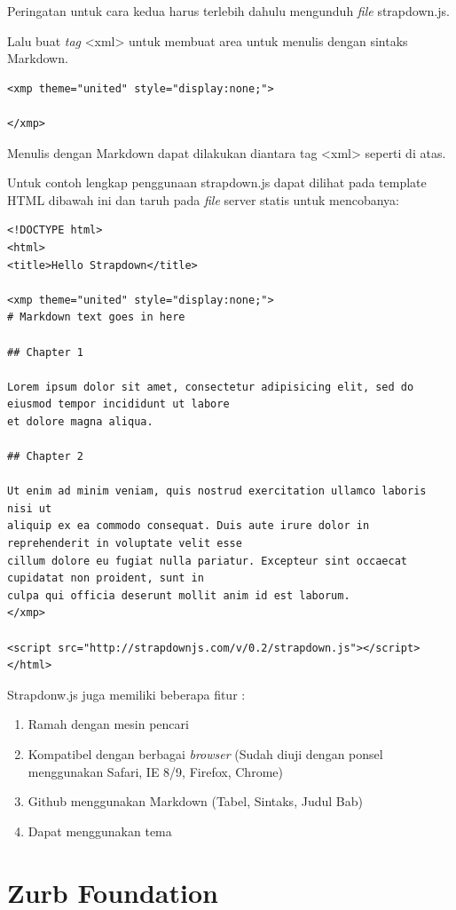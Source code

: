 \begin{itemize}
\begin{itemize}
Peringatan untuk cara kedua harus terlebih dahulu mengunduh {\it file} strapdown.js.

Lalu buat {\it tag} <xml> untuk membuat area untuk menulis dengan sintaks
Markdown.
\begin{lstlisting}[basicstyle=\footnotesize]
<xmp theme="united" style="display:none;">

</xmp>
\end{lstlisting}
Menulis dengan Markdown dapat dilakukan diantara  tag <xml> seperti di atas.

Untuk contoh lengkap penggunaan strapdown.js dapat dilihat pada template HTML
dibawah ini dan taruh pada {\it file} server statis untuk mencobanya:
\begin{lstlisting}[basicstyle=\footnotesize]
<!DOCTYPE html>
<html>
<title>Hello Strapdown</title>

<xmp theme="united" style="display:none;">
# Markdown text goes in here

## Chapter 1

Lorem ipsum dolor sit amet, consectetur adipisicing elit, sed do eiusmod tempor incididunt ut labore
et dolore magna aliqua. 

## Chapter 2

Ut enim ad minim veniam, quis nostrud exercitation ullamco laboris nisi ut
aliquip ex ea commodo consequat. Duis aute irure dolor in reprehenderit in voluptate velit esse
cillum dolore eu fugiat nulla pariatur. Excepteur sint occaecat cupidatat non proident, sunt in
culpa qui officia deserunt mollit anim id est laborum.
</xmp>

<script src="http://strapdownjs.com/v/0.2/strapdown.js"></script>
</html>
\end{lstlisting}

Strapdonw.js juga memiliki beberapa fitur :
\begin{enumerate}[(1)]
\item Ramah dengan mesin pencari
\item Kompatibel dengan berbagai {\it browser} (Sudah diuji dengan ponsel menggunakan
Safari, IE 8/9, Firefox, Chrome)
\item Github menggunakan Markdown (Tabel, Sintaks, Judul Bab)
\item Dapat menggunakan tema
\end{enumerate}

\section{Zurb Foundation \cite{Zurb:2015}}
\label{sec:zurbfoundation}


\end{itemize}
\end{itemize}
